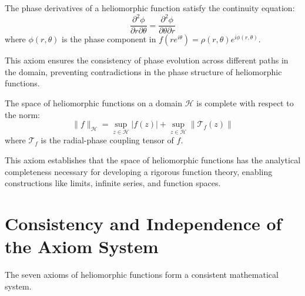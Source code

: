 \begin{axiom}
The phase derivatives of a heliomorphic function satisfy the continuity equation:
\begin{equation}
\frac{\partial^2 \phi}{\partial r \partial \theta} = \frac{\partial^2 \phi}{\partial \theta \partial r}
\end{equation}
where $\phi(r,\theta)$ is the phase component in $f(re^{i\theta}) = \rho(r,\theta)e^{i\phi(r,\theta)}$.
\end{axiom}

This axiom ensures the consistency of phase evolution across different paths in the domain, preventing contradictions in the phase structure of heliomorphic functions.

\begin{axiom}[Completeness]
The space of heliomorphic functions on a domain $\mathcal{H}$ is complete with respect to the norm:
\begin{equation}
\|f\|_{\mathcal{H}} = \sup_{z \in \mathcal{H}} |f(z)| + \sup_{z \in \mathcal{H}} \|\mathcal{T}_f(z)\|
\end{equation}
where $\mathcal{T}_f$ is the radial-phase coupling tensor of $f$.
\end{axiom}

This axiom establishes that the space of heliomorphic functions has the analytical completeness necessary for developing a rigorous function theory, enabling constructions like limits, infinite series, and function spaces.

\section{Consistency and Independence of the Axiom System}

\begin{theorem}
The seven axioms of heliomorphic functions form a consistent mathematical system.
\end{theorem}

